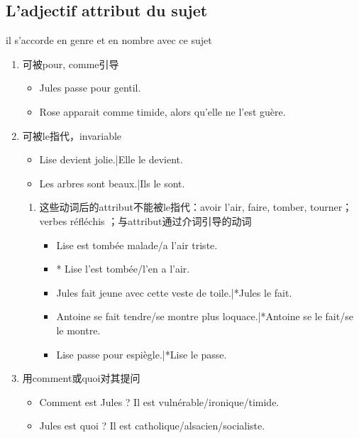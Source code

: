 \documentclass[UTF8]{report}
\begin{document}
\subsection{L’adjectif attribut du sujet}
il s’accorde en genre et en nombre avec ce sujet
\begin{enumerate}
    \item 可被pour, comme引导
    \begin{itemize}
        \item Jules passe pour gentil.
        \item Rose apparait comme timide, alors qu’elle ne l’est guère.
    \end{itemize}
    \item 可被le指代，invariable
    \begin{itemize}
        \item Lise devient jolie.|Elle le devient.
        \item Les arbres sont beaux.|Ils le sont.
    \end{itemize}
    \begin{enumerate}
        \item 这些动词后的attribut不能被le指代：avoir l’air, faire, tomber, tourner；verbes réfléchis ；与attribut通过介词引导的动词
        \begin{itemize}
            \item Lise est tombée malade/a l’air triste.
            \item * Lise l’est tombée/l’en a l’air.
            \item Jules fait jeune avec cette veste de toile.|*Jules le fait.
            \item Antoine se fait tendre/se montre plus loquace.|*Antoine se le fait/se le montre.
            \item Lise passe pour espiègle.|*Lise le passe.
        \end{itemize}
    \end{enumerate}
    \item 用comment或quoi对其提问
    \begin{itemize}
        \item Comment est Jules ? Il est vulnérable/ironique/timide.
        \item Jules est quoi ? Il est catholique/alsacien/socialiste.
    \end{itemize}
\end{enumerate}
\end{document}
